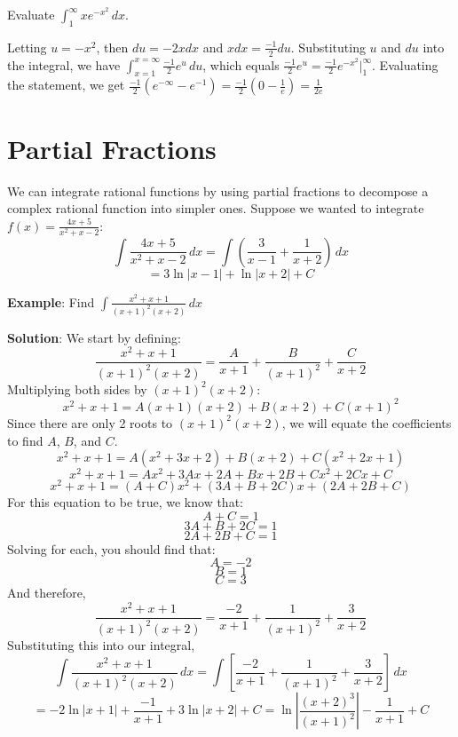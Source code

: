 \begin{Exercise}[label=int_meth4]
Evaluate $\int_1^{\infty}xe^{-x^2}\,dx$. 
\vspace{30mm}
\end{Exercise}

\begin{Answer}[ref=int_meth4]
Letting $u = -x^2$, then $du = -2x dx$ and $x dx = \frac{-1}{2}du$. 
Substituting $u$ and $du$ into the integral, we have $\int_{x = 1}^{x 
= \infty} \frac{-1}{2}e^u\,du$, which equals $\frac{-1}{2}e^u = 
\frac{-1}{2}e^{-x^2}|_1^{\infty}$. Evaluating the statement, we get 
$\frac{-1}{2}(e^{-\infty} - e^{-1}) = \frac{-1}{2}(0-\frac{1}{e}) = 
\frac{1}{2e}$
\end{Answer}


\section{Partial Fractions}
We can integrate rational functions by using partial fractions to decompose a 
complex rational function into simpler ones. Suppose we wanted to integrate $f(x) = \frac{4x + 5}{x^2 + x - 2}$:
$$\int \frac{4x + 5}{x^2 + x - 2}\,dx = \int \left( \frac{3}{x - 1} + \frac{1}{
x + 2} \right)\,dx$$
$$= 3\ln{|x - 1|} + \ln{|x + 2|} + C$$

\textbf{Example}: Find $\int \frac{x^2 + x + 1}{(x + 1)^2 (x + 2)}\,dx$

\textbf{Solution}: We start by defining:
$$\frac{x^2 + x + 1}{(x + 1)^2 (x + 2)} = \frac{A}{x + 1} + \frac{B}{(x + 1)^
2} + \frac{C}{x + 2}$$
Multiplying both sides by $(x + 1)^2 (x + 2)$:
$$x^2 + x + 1 = A(x + 1)(x + 2) + B(x + 2) + C(x + 1)^2$$
Since there are only 2 roots to $(x + 1)^2 (x + 2)$, we will equate the 
coefficients to find $A$, $B$, and $C$. 
$$x^2 + x + 1 = A(x^2 + 3x + 2) + B(x + 2) + C(x^2 + 2x + 1)$$
$$x^2 + x + 1 = Ax^2 + 3Ax + 2A + Bx + 2B + Cx^2 + 2Cx + C$$
$$x^2 + x + 1 = (A + C)x^2 + (3A + B + 2C)x + (2A + 2B + C)$$
For this equation to be true, we know that:
$$A + C = 1$$
$$3A + B + 2C = 1$$
$$2A + 2B + C = 1$$
Solving for each, you should find that:
$$A = -2$$
$$B = 1$$
$$C = 3$$
And therefore, 
$$\frac{x^2 + x + 1}{(x + 1)^2 (x + 2)} = \frac{-2}{x + 1} + \frac{1}{(x + 1)^
2} + \frac{3}{x + 2}$$
Substituting this into our integral, 
$$\int \frac{x^2 + x + 1}{(x + 1)^2 (x + 2)}\,dx = \int \left[ \frac{-2}{x + 1} 
+ \frac{1}{(x + 1)^2} + \frac{3}{x + 2} \right]\,dx$$
$$ = -2\ln{|x + 1|} + \frac{-1}{x + 1} + 3\ln{|x + 2|} + C = \ln{ \left| \frac{
(x + 2)^3}{(x + 1)^2} \right| } - \frac{1}{x + 1} + C$$


